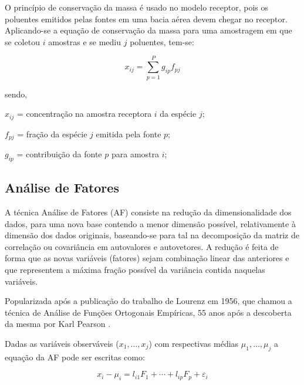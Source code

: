O princípio de conservação da massa é usado no modelo receptor, pois os 
poluentes emitidos pelas fontes em uma bacia aérea devem chegar no 
receptor. Aplicando-se a equação de conservação da massa para uma amostragem 
em que se coletou $i$ amostras e se mediu $j$ poluentes, tem-se:

\begin{equation}
  \label{eq:conservacaomassa}
  x_{ij} = \sum_{p=1}^{P} g_{ip}f_{pj} %
\end{equation} 

sendo,
\begin{itemize}
  \begin{spacing}{1.0}
    \item $x_{ij}$ = concentração na amostra receptora $i$ da espécie $j$;
    \item $f_{pj}$ = fração da espécie $j$ emitida pela fonte $p$;
    \item $g_{ip}$ = contribuição da fonte $p$ para amostra $i$;
  \end{spacing}
\end{itemize}

\subsection{Análise de Fatores}

A técnica Análise de Fatores (AF) consiste na redução da dimensionalidade 
dos dados, para uma nova base contendo a menor dimensão possível, 
relativamente à dimensão dos dados originais, baseando-se para tal na 
decomposição da matriz de correlação ou covariância em autovalores e autovetores. 
A redução é feita de forma que as novas variáveis 
(fatores) sejam combinação linear das anteriores e que representem a máxima 
fração possível da variância contida naquelas variáveis.

Popularizada após a publicação do trabalho de Lourenz em 1956, que chamou 
a técnica de Análise de Funções Ortogonais Empíricas, 55 anos após a 
descoberta da mesma por Karl Pearson \citep{bartholomew2011}.

Dadas as variáveis observáveis ($x_1,\dots,x_j$) com 
respectivas médias $\mu_1,\dots,\mu_j$ a equação da AF pode ser escritas como: 
 
\begin{equation}
  \label{eq:af}
  x_i-\mu_i = l_{i1} F_1 + \cdots + l_{ip} F_p + \varepsilon_i 
\end{equation}

